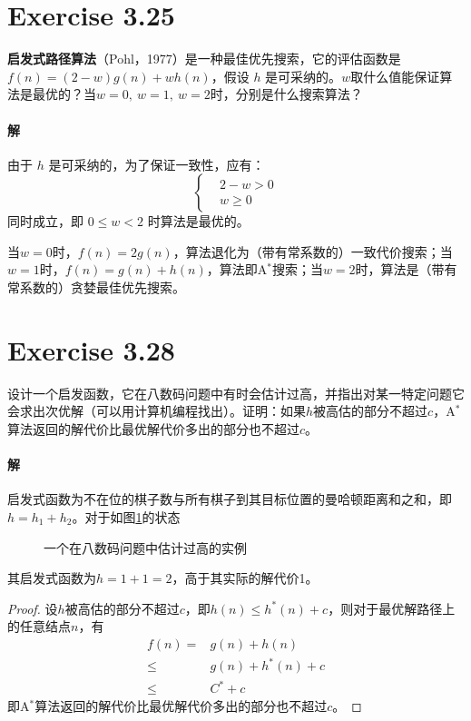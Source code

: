 \documentclass{article}
\newcounter{row}
\newcounter{col}
\newcommand\setrow[3]{
  \setcounter{col}{1}
  \foreach \n in {#1, #2, #3} {
    \edef\x{\value{col} - 0.5}
    \edef\y{3.5 - \value{row}}
    \node[anchor = center] at (\x, \y) {\n};
    \stepcounter{col}
  }
  \stepcounter{row}
}
\begin{document}
\section{Exercise 3.25}
\textbf{启发式路径算法}（Pohl，1977）是一种最佳优先搜索，它的评估函数是$f(n) = (2 - w)g(n) + wh(n)$，假设 $h$ 是可采纳的。$w$取什么值能保证算法是最优的？当$w = 0,\ w = 1,\ w = 2$时，分别是什么搜索算法？

\paragraph{解}
由于 $h$ 是可采纳的，为了保证一致性，应有：
\begin{equation*}
    \left\{
        \begin{aligned}
            & 2 - w > 0 \\
            & w \geqslant 0
        \end{aligned}
    \right.
\end{equation*}
同时成立，即 $0 \leqslant w < 2$ 时算法是最优的。

当$w = 0$时，$f(n) = 2g(n)$，算法退化为（带有常系数的）一致代价搜索；当$w = 1$时，$f(n) = g(n) + h(n)$，算法即A$^*$搜索；当$w = 2$时，算法是（带有常系数的）贪婪最佳优先搜索。

\section{Exercise 3.28}
设计一个启发函数，它在八数码问题中有时会估计过高，并指出对某一特定问题它会求出次优解（可以用计算机编程找出）。证明：如果$h$被高估的部分不超过$c$，A$^*$算法返回的解代价比最优解代价多出的部分也不超过$c$。

\paragraph{解}
启发式函数为不在位的棋子数与所有棋子到其目标位置的曼哈顿距离和之和，即$h = h_1 + h_2$。对于如图\ref{figure:2}的状态
\begin{figure}[h]
    \centering
    \label{figure:2}
    \caption{一个在八数码问题中估计过高的实例}
\end{figure}
其启发式函数为$h = 1 + 1 = 2$，高于其实际的解代价1。
\begin{proof}
    设$h$被高估的部分不超过$c$，即$h(n) \leqslant h^*(n) + c$，则对于最优解路径上的任意结点$n$，有
    \begin{align*}
        f(n) = & g(n) + h(n) \\
        \leqslant & g(n) + h^*(n) + c \\
        \leqslant & C^* + c
    \end{align*}
    即A$^*$算法返回的解代价比最优解代价多出的部分也不超过$c$。
\end{proof}
\end{document}
